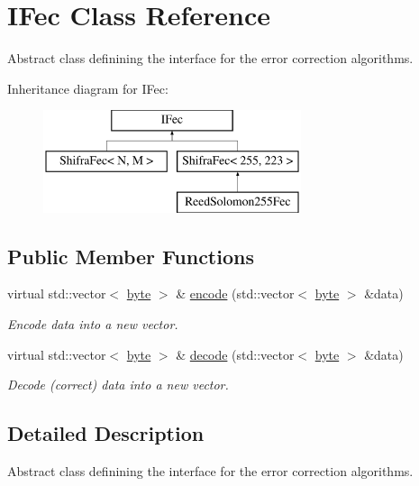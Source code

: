 \hypertarget{classefb_1_1IFec}{
\section{IFec Class Reference}
\label{classefb_1_1IFec}
}


Abstract class definining the interface for the error correction algorithms.  


Inheritance diagram for IFec:\begin{figure}[H]
\begin{center}
\leavevmode
\includegraphics[height=3.000000cm]{classefb_1_1IFec}
\end{center}
\end{figure}
\subsection*{Public Member Functions}
\begin{DoxyCompactItemize}
\item 
virtual std::vector$<$ \hyperlink{namespaceefb_a0c8186d9b9b7880309c27230bbb5e69d}{byte} $>$ \& \hyperlink{classefb_1_1IFec_af8204657b9bd4cef16bff02d9e6256f8}{encode} (std::vector$<$ \hyperlink{namespaceefb_a0c8186d9b9b7880309c27230bbb5e69d}{byte} $>$ \&data)
\begin{DoxyCompactList}\small\item\em Encode data into a new vector. \item\end{DoxyCompactList}\item 
virtual std::vector$<$ \hyperlink{namespaceefb_a0c8186d9b9b7880309c27230bbb5e69d}{byte} $>$ \& \hyperlink{classefb_1_1IFec_ae214f6def8bf8f1b560b8f3bbdb5271b}{decode} (std::vector$<$ \hyperlink{namespaceefb_a0c8186d9b9b7880309c27230bbb5e69d}{byte} $>$ \&data)
\begin{DoxyCompactList}\small\item\em Decode (correct) data into a new vector. \item\end{DoxyCompactList}\end{DoxyCompactItemize}


\subsection{Detailed Description}
Abstract class definining the interface for the error correction algorithms. 

